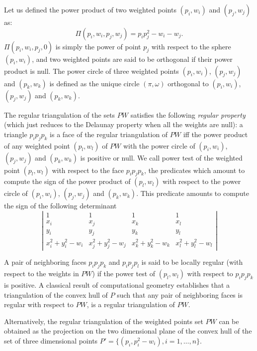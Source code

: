 Let us defined the power product of two weighted points
$(p_i, w_i)$ and $(p_j, w_j)$ as:
\[\Pi(p_i, w_i,p_j, w_j) = p_ip_j ^2 - w_i  - w_j  .\]
$\Pi(p_i, w_i,p_j, 0)$ is simply the power of point $p_j$
with respect to the sphere $(p_i, w_i)$, and two weighted points 
are said to be orthogonal if their power product is null.
The power circle of three weighted points
 $(p_i, w_i)$, $(p_j, w_j)$
and $(p_k, w_k)$ is defined as the unique circle
$(\pi, \omega)$  orthogonal to
 $(p_i, w_i)$, $(p_j, w_j)$
and $(p_k, w_k)$.

The regular triangulation of the sets ${  PW}$
satisfies the following {\em regular property} (which just reduces to the 
Delaunay property when all the weights are null):
a triangle $p_ip_jp_k$ is a face of the regular triangulation
of ${  PW}$ iff the power product of any weighted point
 $(p_l, w_l)$ of ${  PW}$ with the power circle of
 $(p_i, w_i)$, $(p_j, w_j)$ and $(p_k, w_k)$ is positive or null.
We call  power test of the weighted point $(p_l, w_l)$ with respect
to the face  $p_ip_jp_k$, the predicates which amount to compute
the sign of 
the power product of $(p_l, w_l)$ with respect to
the power circle of
 $(p_i, w_i)$, $(p_j, w_j)$ and $(p_k, w_k)$.
This predicate amounts to compute the sign of
the following
determinant
\[\left| \begin{array}{cccc}
1    & 1                       & 1                       & 1 \\
x_i & x_j & x_k & x_l \\
y_i & y_j & y_k & y_l \\
x_i ^2 + y_i ^2 -w_i & x_j ^2 + y_j ^2 - w_j & x_k ^2 + y_k ^2 - w_k &
x_l ^2 + y_l ^2 -w_l  
\end{array}
\right|
\]

A pair of neighboring faces $p_ip_jp_k$
and $p_ip_jp_l$ is said to be locally regular
(with respect to  the weights in ${  PW}$)
if the power test of $(p_l,w_l)$ with respect to
$p_ip_jp_k$ is positive.
A classical  result of computational geometry
establishes that a triangulation of the convex hull of ${  P}$
such that any pair of neighboring faces is regular with respect
to ${  PW}$, is a
 regular triangulation of ${  PW}$.

Alternatively, the regular triangulation
of the weighted points set ${  PW}$
can be obtained as the projection
on the two dimensional plane of the convex hull of the set of three
dimensional points 
${  P'}= \{ (p_i,p_i ^2 - w_i ), i = 1, \ldots , n \}$.

